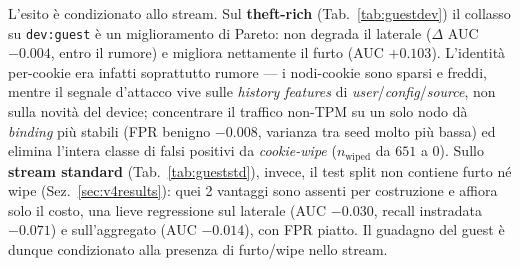 \begin{table}[ht!]
\centering
\renewcommand{\arraystretch}{1.4}
\caption{Identità del device sullo \emph{stream standard} (200k/15ep, decisione instradata): \textit{keying} per-cookie vs collasso su \texttt{dev:guest} (3 \texttt{seed}, \texttt{save=False}, confronto appaiato per seed). A differenza del regime theft-rich (Tab.~\ref{tab:guestdev}), qui il guest è una lieve regressione: lo split di test standard non contiene furto né cookie-wipe.}
\label{tab:gueststd}
\end{table}


L'esito è condizionato allo stream. Sul \textbf{theft-rich} (Tab.~\ref{tab:guestdev}) il collasso su \texttt{dev:guest} è un miglioramento di Pareto: non degrada il laterale ($\Delta$ AUC $-0.004$, entro il rumore) e migliora nettamente il furto (AUC $+0.103$). L'identità per-cookie era infatti soprattutto rumore --- i nodi-cookie sono sparsi e freddi, mentre il segnale d'attacco vive sulle \textit{history features} di \textit{user}/\textit{config}/\textit{source}, non sulla novità del device; concentrare il traffico non-TPM su un solo nodo dà \textit{binding} più stabili (FPR benigno $-0.008$, varianza tra seed molto più bassa) ed elimina l'intera classe di falsi positivi da \textit{cookie-wipe} ($n_{\text{wiped}}$ da $651$ a $0$). Sullo \textbf{stream standard} (Tab.~\ref{tab:gueststd}), invece, il test split non contiene furto né wipe (Sez.~\ref{sec:v4results}): quei 2 vantaggi sono assenti per costruzione e affiora solo il costo, una lieve regressione sul laterale (AUC $-0.030$, recall instradata $-0.071$) e sull'aggregato (AUC $-0.014$), con FPR piatto. Il guadagno del guest è dunque condizionato alla presenza di furto/wipe nello stream.

